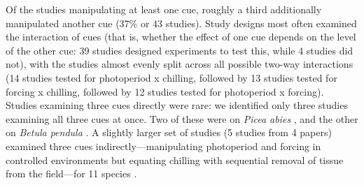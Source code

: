 \documentclass[11pt,letter]{article}
\begin{document}
Of the studies manipulating at least one cue, roughly a third additionally manipulated another cue (37\% or 43 studies). Study designs most often examined the interaction of cues (that is, whether the effect of one cue depends on the level of the other cue: 39 studies designed experiments to test this, while 4 studies did not), with the studies almost evenly split across all possible two-way interactions (14 studies tested for photoperiod x chilling, followed by 13 studies tested for forcing x chilling, followed by 12 studies tested for photoperiod x forcing). \\

Studies examining three cues directly were rare: we identified only three studies examining all three cues at once. Two of these were on \emph{Picea abies} \citep{Worrall:1967aa,Sogaard:2008aa}, and the other on \emph{Betula pendula} \citep{Skuterud:1994aa}. A slightly larger set of studies (5 studies from 4 papers) examined three cues indirectly---manipulating photoperiod and forcing in controlled environments but equating chilling with sequential removal of tissue from the field---for 11 species \citep{Schnabel:1987aa,Heide:1993,Partanen:1998aa,Basler:2014aa}. \\
\end{document}
